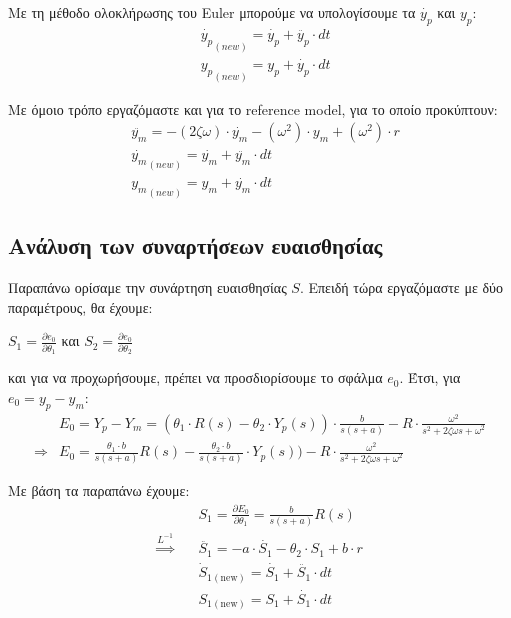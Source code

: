 \documentclass{article}
\begin{document}
\hfill\break
Με τη μέθοδο ολοκλήρωσης του Euler μπορούμε να υπολογίσουμε τα \(\dot{y_p}\) και \(y_p\):
\begin{align*}
    & \dot{y_p}_{(new)} = \dot{y_p} + \ddot{y_p} \cdot dt \\
    & {y_p}_{(new)} = y_p + \dot{y_p} \cdot dt
\end{align*}

\hfill\break
Με όμοιο τρόπο εργαζόμαστε και για το reference model, για το οποίο προκύπτουν:
\begin{align*}
    & \ddot{y_m} = -(2\zeta\omega) \cdot \dot{y_m} - (\omega^2) \cdot y_m + (\omega^2) \cdot r \\
    & \dot{y_m}_{(new)} = \dot{y_m} + \ddot{y_m} \cdot dt \\
    & {y_m}_{(new)} = y_m + \dot{y_m} \cdot dt
\end{align*}

\subsection{Ανάλυση των συναρτήσεων ευαισθησίας}
Παραπάνω ορίσαμε την συνάρτηση ευαισθησίας \(S\). Επειδή τώρα εργαζόμαστε με δύο παραμέτρους, θα έχουμε:

\hfill\break
\begin{math}
    S_1 = \frac{\partial e_0}{\partial \theta_1}
\end{math} και
\begin{math}
    S_2 = \frac{\partial e_0}{\partial \theta_2}
\end{math}

\hfill\break
και για να προχωρήσουμε, πρέπει να προσδιορίσουμε το σφάλμα \(e_0\). Έτσι, για \(e_0 = y_p - y_m\):
\begin{align*}
    & E_0 = Y_p - Y_m = (\theta_1 \cdot R(s) - \theta_2 \cdot Y_p(s)) \cdot \frac{b}{s(s+a)} - R \cdot \frac{\omega^2}{s^2 + 2 ζ \omega s + \omega^2} \\
    \Rightarrow & E_0 = \frac{\theta_1 \cdot b}{s(s+a)} R(s) - \frac{\theta_2 \cdot b}{s(s+a)} \cdot Y_p(s)) - R \cdot \frac{\omega^2}{s^2 + 2 ζ \omega s + \omega^2}
\end{align*}

\hfill\break
Με βάση τα παραπάνω έχουμε:
\begin{align*}
    & S_1 = \frac{\partial E_0}{\partial\theta_1} = \frac{b}{s(s+a)} R(s) \\
    \overset{L^{-1}}{\Longrightarrow} \quad &\ddot{S_1} = -a \cdot \dot{S_1} - \theta_2 \cdot S_1 + b \cdot r \\
    & \dot{S}_{1(\mathrm{new})} = \dot{S_1} + \ddot{S_1} \cdot dt \\
    & S_{1(\mathrm{new})} = S_1 + \dot{S_1} \cdot dt
\end{align*}
\end{document}
